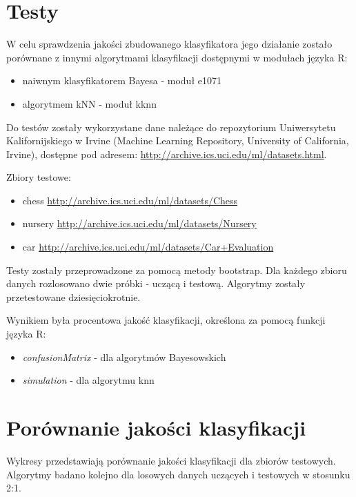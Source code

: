 \documentclass[paper=a4, fontsize=11pt]{scrartcl} %
\numberwithin{equation}{section} %
\numberwithin{figure}{section} %
\numberwithin{table}{section} %
\begin{document}
\section{Testy}
\label{ref:testy}

W celu sprawdzenia jakości zbudowanego klasyfikatora jego działanie zostało porównane z innymi algorytmami klasyfikacji dostępnymi w modułach języka R: \\
\begin{itemize}
\item naiwnym klasyfikatorem Bayesa - moduł e1071
\item algorytmem kNN - moduł kknn 
\end{itemize}

Do testów zostały wykorzystane dane należące do repozytorium Uniwersytetu Kalifornijskiego w Irvine (Machine Learning Repository, University of California, Irvine), dostępne pod adresem: \url{http://archive.ics.uci.edu/ml/datasets.html}.

Zbiory testowe:
\begin{itemize}
\item chess \url{http://archive.ics.uci.edu/ml/datasets/Chess}
\item nursery \url{http://archive.ics.uci.edu/ml/datasets/Nursery}
\item car \url{http://archive.ics.uci.edu/ml/datasets/Car+Evaluation}
\end{itemize}

Testy zostały przeprowadzone za pomocą metody bootstrap. Dla każdego zbioru danych rozlosowano dwie próbki - uczącą i testową. Algorytmy zostały przetestowane dziesięciokrotnie.

Wynikiem była procentowa jakość klasyfikacji, określona za pomocą funkcji języka R:
\begin{itemize}
\item \textit{confusionMatrix} - dla algorytmów Bayesowskich
\item \textit{simulation} - dla algorytmu knn
\end{itemize}

\section{Porównanie jakości klasyfikacji }

Wykresy przedstawiają porównanie jakości klasyfikacji dla zbiorów testowych. Algorytmy badano kolejno dla losowych danych uczących i testowych w stosunku 2:1.
\end{document}
